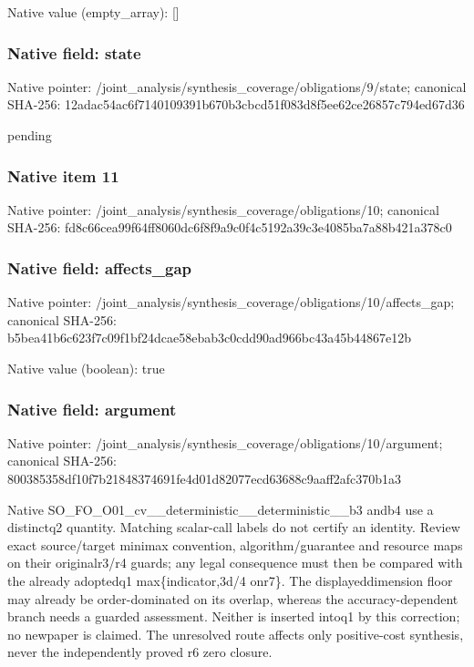 \documentclass[10pt,a4paper]{article}
\begin{document}
Native value (empty\_\allowbreak{}array): []

\subsubsection{Native field: state}
Native pointer: /joint\_\allowbreak{}analysis/synthesis\_\allowbreak{}coverage/obligations/9/state; canonical SHA-256: 12adac54ac6f7140109391b670b3cbcd51f083d8f5ee62ce26857c794ed67d36

\begingroup\raggedright\sloppy pending\par\endgroup

\subsubsection{Native item 11}
Native pointer: /joint\_\allowbreak{}analysis/synthesis\_\allowbreak{}coverage/obligations/10; canonical SHA-256: fd8c66cea99f64ff8060dc6f8f9a9c0f4c5192a39c3e4085ba7a88b421a378c0

\subsubsection{Native field: affects\_\allowbreak{}gap}
Native pointer: /joint\_\allowbreak{}analysis/synthesis\_\allowbreak{}coverage/obligations/10/affects\_\allowbreak{}gap; canonical SHA-256: b5bea41b6c623f7c09f1bf24dcae58ebab3c0cdd90ad966bc43a45b44867e12b

Native value (boolean): true

\subsubsection{Native field: argument}
Native pointer: /joint\_\allowbreak{}analysis/synthesis\_\allowbreak{}coverage/obligations/10/argument; canonical SHA-256: 800385358df10f7b21848374691fe4d01d82077ecd63688c9aaff2afc370b1a3

\begingroup\raggedright\sloppy Native SO\_\allowbreak{}FO\_\allowbreak{}O01\_\allowbreak{}cv\_\allowbreak{}\_\allowbreak{}deterministic\_\allowbreak{}\_\allowbreak{}deterministic\_\allowbreak{}\_\allowbreak{}b3 andb4 use a distinctq2 quantity. Matching scalar-call labels do not certify an identity. Review exact source/\allowbreak{}target minimax convention,\allowbreak{} algorithm/\allowbreak{}guarantee and resource maps on their originalr3/\allowbreak{}r4 guards;\allowbreak{} any legal consequence must then be compared with the already adoptedq1 max\{indicator,\allowbreak{}3d/\allowbreak{}4 onr7\}. The displayeddimension floor may already be order-dominated on its overlap,\allowbreak{} whereas the accuracy-dependent branch needs a guarded assessment. Neither is inserted intoq1 by this correction;\allowbreak{} no newpaper is claimed. The unresolved route affects only positive-cost synthesis,\allowbreak{} never the independently proved r6 zero closure.\par\endgroup
\end{document}
